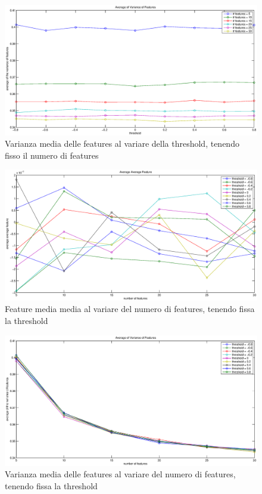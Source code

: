 \documentclass[a4paper,10pt]{article}
\begin{document}
\begin{figure}[!ht]
\begin{center}
\includegraphics[width=\textwidth]{AveVarFeatThreshold.eps}
\end{center}
\caption{Varianza media delle features al variare della threshold, tenendo fisso il numero di features}
\label{2.1.6}
\end{figure}

\begin{figure}[!ht]
\begin{center}
\includegraphics[width=\textwidth]{AverageAverageFeatureFeatures.eps}
\end{center}
\caption{Feature media media al variare del numero di features, tenendo fissa la threshold}
\label{2.1.7}
\end{figure}

\begin{figure}[!ht]
\begin{center}
\includegraphics[width=\textwidth]{AveVarFeatFeatures.eps}
\end{center}
\caption{Varianza media delle features al variare del numero di features, tenendo fissa la threshold}
\label{2.1.8}
\end{figure}
\end{document}
